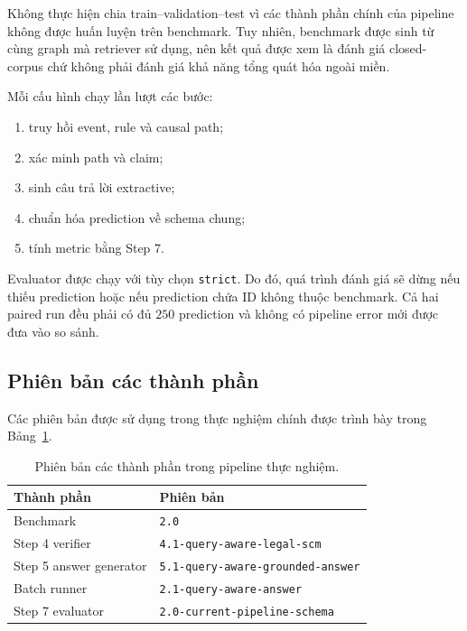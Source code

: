 Không thực hiện chia train--validation--test vì các thành phần chính của
pipeline không được huấn luyện trên benchmark. Tuy nhiên, benchmark được sinh
từ cùng graph mà retriever sử dụng, nên kết quả được xem là đánh giá
closed-corpus chứ không phải đánh giá khả năng tổng quát hóa ngoài miền.

Mỗi cấu hình chạy lần lượt các bước:

\begin{enumerate}
    \item truy hồi event, rule và causal path;
    \item xác minh path và claim;
    \item sinh câu trả lời extractive;
    \item chuẩn hóa prediction về schema chung;
    \item tính metric bằng Step 7.
\end{enumerate}

Evaluator được chạy với tùy chọn \texttt{strict}. Do đó, quá trình đánh giá
sẽ dừng nếu thiếu prediction hoặc nếu prediction chứa ID không thuộc
benchmark. Cả hai paired run đều phải có đủ \(250\) prediction và không có
pipeline error mới được đưa vào so sánh.

\subsection{Phiên bản các thành phần}

Các phiên bản được sử dụng trong thực nghiệm chính được trình bày trong
Bảng~\ref{tab:versions}.

\begin{table}[t]
    \centering
    \caption{Phiên bản các thành phần trong pipeline thực nghiệm.}
    \label{tab:versions}
    \begin{tabular}{ll}
        \hline
        \textbf{Thành phần} & \textbf{Phiên bản} \\
        \hline
        Benchmark & \texttt{2.0} \\
        Step 4 verifier & \texttt{4.1-query-aware-legal-scm} \\
        Step 5 answer generator & \texttt{5.1-query-aware-grounded-answer} \\
        Batch runner & \texttt{2.1-query-aware-answer} \\
        Step 7 evaluator & \texttt{2.0-current-pipeline-schema} \\
        \hline
    \end{tabular}
\end{table}

